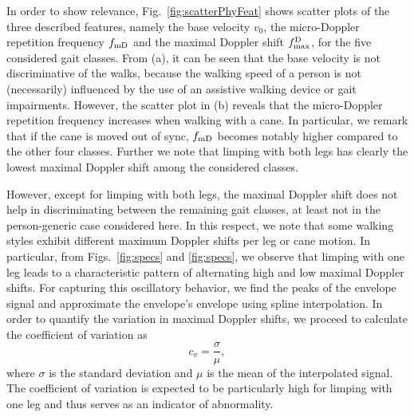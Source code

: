 In order to show relevance, Fig.~\ref{fig:scatterPhyFeat} shows scatter plots of the three described features, namely the base velocity $v_0$, the micro-Doppler repetition frequency ${f_\text{mD}}$ and the maximal Doppler shift ${f^\mathrm{D}_\text{max}}$, for the five considered gait classes. From (a), it can be seen that the base velocity is not discriminative of the walks, because the walking speed of a person is not (necessarily) influenced by the use of an assistive walking device or gait impairments. However, the scatter plot in (b) reveals that the micro-Doppler repetition frequency increases when walking with a cane. In particular, we remark that if the cane is moved out of sync, ${f_\text{mD}}$ becomes notably higher compared to the other four classes. Further we note that limping with both legs has clearly the lowest maximal Doppler shift among the considered classes.

However, except for limping with both legs, the maximal Doppler shift does not help in discriminating between the remaining gait classes, at least not in the person-generic case considered here. In this respect, we note that some walking styles exhibit different maximum Doppler shifts per leg or cane motion. In particular, from Figs.~\ref{fig:specs} and \ref{fig:specs}, we observe that limping with one leg leads to a characteristic pattern of alternating high and low maximal Doppler shifts. For capturing this oscillatory behavior, we find the peaks of the envelope signal and approximate the envelope's envelope using spline interpolation. In order to quantify the variation in maximal Doppler shifts, we proceed to calculate the coefficient of variation as
\begin{equation}
c_v = \frac{\sigma}{\mu},
\end{equation}
where $\sigma$ is the standard deviation and $\mu$ is the mean of the interpolated signal. The coefficient of variation is expected to be particularly high for limping with one leg and thus serves as an indicator of abnormality.

